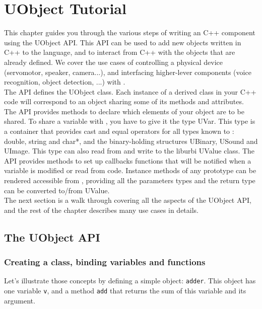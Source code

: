 \chapter{UObject Tutorial}

This chapter guides you through the various steps of writing an \urbi
C++ component using the UObject API. This API can be used to add new
objects written in C++ to the \urbi language, and to interact from C++
with the objects that are already defined. We cover the use cases of
controlling a physical device (servomotor, speaker, camera...), and
interfacing higher-lever components (voice recognition, object
detection, ...) with \urbi.\\

The API defines the UObject class. Each instance of a derived class in
your C++ code will correspond to an \urbi object sharing some of its
methods and attributes. The API provides methods to declare which
elements of your object are to be shared. To share a variable with
\urbi, you have to give it the type UVar. This type is a container that
provides cast and equal operators for all types known to \urbi: double,
string and char*, and the binary-holding structures UBinary, USound
and UImage. This type can also read from and write to the liburbi
UValue class. The API provides methods to set up callbacks functions
that will be notified when a variable is modified or read from \urbi
code. Instance methods of any prototype can be rendered accessible
from \urbi, providing all the parameters types and the return type can
be converted to/from UValue.\\

The next section is a walk through covering all the aspects of the
UObject API, and the rest of the chapter describes many use cases in
details.\\

\section{The UObject API}

\subsection{Creating a class, binding variables and functions}

Let's illustrate those concepts by defining a simple object:
\lstinline{adder}. This object has one variable \lstinline{v}, and a
method \lstinline{add} that returns the sum of this variable and its
argument.

